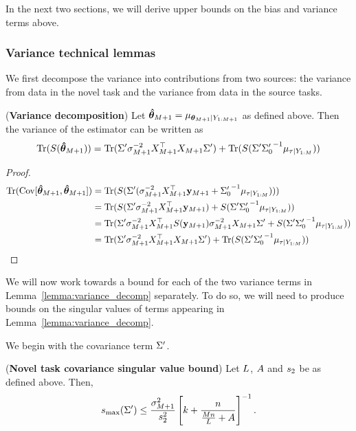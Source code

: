 \noindent In the next two sections, we will derive upper bounds on the bias and variance terms above.

\subsubsection{Variance technical lemmas}

We first decompose the variance into contributions from two sources: the variance from data in the novel task and the variance from data in the source tasks.

\begin{lemma}(\textbf{Variance decomposition})\label{lemma:variance_decomp}
Let $\bm{\hat{\theta}}_{M+1} = \mu_{\bm{\theta}_{M+1} \vert Y_{1:M+1}}$ as defined above. Then the variance of the estimator can be written as
\[\mathrm{Tr}(S(\bm{\hat{\theta}}_{M+1})) = \mathrm{Tr}({\Sigma'} \sigma_{M+1}^{-2} X_{M+1}^\top X_{M+1} {\Sigma'}) + \mathrm{Tr}(S({\Sigma'} {{\Sigma'_{0}}}^{-1} \mu_{\tau \vert Y_{1:M}})) \]
\end{lemma}
\begin{proof}
\begin{align}
\mathrm{Tr}(\mathop{\mathrm{Cov}} [\bm{\hat{\theta}}_{M+1}, \bm{\hat{\theta}}_{M+1}]) &= \mathrm{Tr}(S({\Sigma'} (\sigma_{M+1}^{-2} X_{M+1}^\top \mathbf{y}_{M+1} + {{\Sigma'_{0}}}^{-1} \mu_{\tau \vert Y_{1:M}})))\\
&=\mathrm{Tr}(S({\Sigma'} \sigma_{M+1}^{-2} X_{M+1}^\top \mathbf{y}_{M+1}) + S({\Sigma'} {{\Sigma'_{0}}}^{-1}  \mu_{\tau \vert Y_{1:M}}))\\
&=\mathrm{Tr}({\Sigma'} \sigma_{M+1}^{-2} X_{M+1}^\top S(\mathbf{y}_{M+1}) \sigma_{M+1}^{-2} X_{M+1} {\Sigma'} + S({\Sigma'} {{\Sigma'_{0}}}^{-1} \mu_{\tau \vert Y_{1:M}}))\\
&=\mathrm{Tr}({\Sigma'} \sigma_{M+1}^{-2} X_{M+1}^\top X_{M+1} {\Sigma'}) + \mathrm{Tr}(S({\Sigma'} {{\Sigma'_{0}}}^{-1} \mu_{\tau \vert Y_{1:M}}))\label{eqn:variance_decomp}
\end{align}
\end{proof}

We will now work towards a bound for each of the two variance terms in Lemma~\ref{lemma:variance_decomp} separately. To do so, we will need to produce bounds on the singular values of terms appearing in Lemma~\ref{lemma:variance_decomp}.

\noindent We begin with the covariance term ${\Sigma'}$.

\begin{lemma}(\textbf{Novel task covariance singular value bound})\label{lemma:novel_tasks_cov_bound}
Let $L$, $A$ and $s_2$ be as defined above. Then,
\[{s_{\max}}({\Sigma'}) \leq \frac{{\sigma_{M+1}^2}}{s_2^2}
\left[ {k} + 
\frac{{n}}{\frac{M{n}}{L} + A} \right]^{-1}. \]
\end{lemma}

